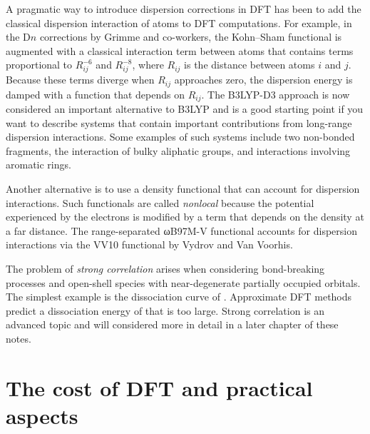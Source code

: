 \documentclass[../Main/notes.tex]{subfiles}
\begin{document}
A pragmatic way to introduce dispersion corrections in DFT has been to add the classical dispersion interaction of atoms to DFT computations.
For example, in the D$n$ corrections by Grimme and co-workers, the Kohn--Sham functional is augmented with a classical interaction term between atoms that contains terms proportional to $R_{ij}^{-6}$ and $R_{ij}^{-8}$, where $R_{ij}$ is the distance between atoms $i$ and $j$.
Because these terms diverge when $R_{ij}$ approaches zero, the dispersion energy is damped with a function that depends on $R_{ij}$.
The B3LYP-D3 approach is now considered an important alternative to B3LYP and is a good starting point if you want to describe systems that contain important contributions from long-range dispersion interactions.
Some examples of such systems include two non-bonded fragments, the interaction of bulky aliphatic groups, and interactions involving aromatic rings.

Another alternative is to use a density functional that can account for dispersion interactions.
Such functionals are called \emph{nonlocal} because the potential experienced by the electrons is modified by a term that depends on the density at a far distance.
The range-separated ωB97M-V functional accounts for dispersion interactions via the VV10 functional by Vydrov and Van Voorhis.

The problem of \emph{strong correlation} arises when considering bond-breaking processes and open-shell species with near-degenerate partially occupied orbitals.
The simplest example is the dissociation curve of .
Approximate DFT methods predict a dissociation energy of  that is too large.
Strong correlation is an advanced topic and will considered more in detail in a later chapter of these notes.

\section{The cost of DFT and practical aspects}
\end{document}

